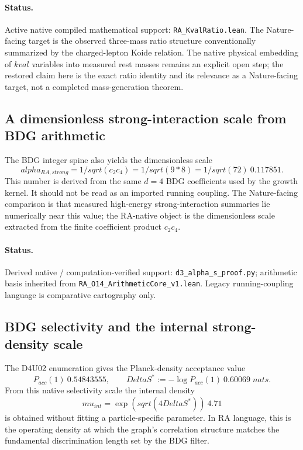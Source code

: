 \documentclass[11pt]{article}
\def\Delta{Delta}%
\def\mu{mu}%
\def\alpha{alpha}%
\def\mathrm#1{#1}%
\def\sqrt#1{sqrt(#1)}%
\def\frac#1#2{#1/#2}%
\def\cdot{*}%
\def\approx{~}%
\begin{document}
\paragraph{Status.} Active native compiled mathematical support: \texttt{RA\_KvalRatio.lean}. The Nature-facing target is the observed three-mass ratio structure conventionally summarized by the charged-lepton Koide relation. The native physical embedding of \(\mathrm{kval}\) variables into measured rest masses remains an explicit open step; the restored claim here is the exact ratio identity and its relevance as a Nature-facing target, not a completed mass-generation theorem.

\subsection{A dimensionless strong-interaction scale from BDG arithmetic}

The BDG integer spine also yields the dimensionless scale
\begin{equation}
\alpha_{\mathrm{RA,strong}}=\frac{1}{\sqrt{c_2c_4}}=\frac{1}{\sqrt{9\cdot 8}}=\frac{1}{\sqrt{72}}\approx 0.117851.
\end{equation}
This number is derived from the same \(d=4\) BDG coefficients used by the growth kernel. It should not be read as an imported running coupling. The Nature-facing comparison is that measured high-energy strong-interaction summaries lie numerically near this value; the RA-native object is the dimensionless scale extracted from the finite coefficient product \(c_2c_4\).

\paragraph{Status.} Derived native / computation-verified support: \texttt{d3\_alpha\_s\_proof.py}; arithmetic basis inherited from \texttt{RA\_O14\_ArithmeticCore\_v1.lean}. Legacy running-coupling language is comparative cartography only.

\subsection{BDG selectivity and the internal strong-density scale}

The D4U02 enumeration gives the Planck-density acceptance value
\begin{equation}
P_{\mathrm{acc}}(1)\approx 0.54843555,
\qquad
\Delta S^*:=-\log P_{\mathrm{acc}}(1)\approx 0.60069\;\mathrm{nats}.
\end{equation}
From this native selectivity scale the internal density
\begin{equation}
\mu_{\mathrm{int}}=\exp\!\left(\sqrt{4\Delta S^*}\right)\approx 4.71
\end{equation}
is obtained without fitting a particle-specific parameter. In RA language, this is the operating density at which the graph's correlation structure matches the fundamental discrimination length set by the BDG filter.
\end{document}
